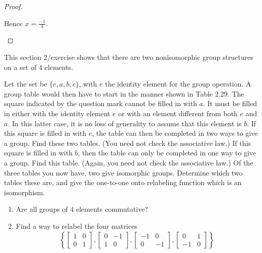 \begin{proof}
\begin{enumerate}[label={\textbf{\alph*.}}]
              Hence $x = \frac{-1}{3}$.
    \end{enumerate}
\end{proof}

\begin{exercise}
    This section 2/exercise shows that there are two nonisomorphic group structures on a set of $4$ elements.

    Let the set be $\{ e, a, b, c \}$, with $e$ the identity element for the group operation. A group table would then have to start in the manner shown in Table 2.29. The square indicated by the question mark cannot be filled in with $a$. It must be filled in either with the identity element $e$ or with an element different from both $e$ and $a$. In this latter case, it is no loss of generality to assume that this element is $b$. If this square is filled in with $e$, the table can then be completed in two ways to give a group. Find these two tables. (You need not check the associative law.) If this square is filled in with $b$, then the table can only be completed in one way to give a group. Find this table. (Again, you need not check the associative law.) Of the three tables you now have, two give isomorphic groups. Determine which two tables these are, and give the one-to-one onto relabeling function which is an isomorphism.

    \begin{enumerate}[label={\textbf{\alph*}}]
        \item Are all groups of $4$ elements commutative?
        \item Find a way to relabel the four matrices
              \[
                  \left\{\begin{bmatrix}
                      1 & 0 \\
                      0 & 1
                  \end{bmatrix},
                  \begin{bmatrix}
                      0 & -1 \\
                      1 & 0
                  \end{bmatrix},
                  \begin{bmatrix}
                      -1 & 0  \\
                      0  & -1
                  \end{bmatrix},
                  \begin{bmatrix}
                      0  & 1 \\
                      -1 & 0
                  \end{bmatrix}\right\}
              \]


\end{enumerate}
\end{exercise}
